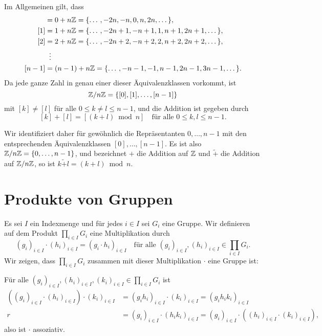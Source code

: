 Im Allgemeinen gilt, dass
\begin{align*}
 [0] &= 0+n\Zbb = \{\dotso, -2n, -n, 0, n, 2n, \dotso\}, \\
 [1] &= 1+n\Zbb = \{\dotso, -2n+1, -n+1, 1, n+1, 2n+1, \dotso\}, \\
 [2] &= 2+n\Zbb = \{\dotso, -2n+2, -n+2, 2, n+2, 2n+2, \dotso\}, \\
     &\;\;\vdots \\
 [n-1] &= (n-1)+n\Zbb = \{\dotso, -n-1, -1, n-1, 2n-1, 3n-1, \dotso\}.
\end{align*}
Da jede ganze Zahl in genau einer dieser Äquivalenzklassen vorkommt, ist
\[
 \mathbb{Z}/n\mathbb{Z} = \{[0], [1], \dotsc, [n-1]\}
\]
mit $[k] \neq [l]$ für alle $0 \leq k \neq l \leq n-1$, und die Addition ist gegeben durch
\[
 [k] + [l] = [(k+l) \bmod n]
 \quad
 \text{für alle $0 \leq k,l \leq n-1$}.
\]

Wir identifiziert daher für gewöhnlich die Repräsentanten $0, \dotsc, n-1$ mit den entsprechenden Äquivalenzklassen $[0], \dotsc, [n-1]$. Es ist also $\mathbb{Z}/n\mathbb{Z} = \{0, \dotsc, n-1\}$, und bezeichnet $+$ die Addition auf $\mathbb{Z}$ und $\tilde{+}$ die Addition auf $\mathbb{Z}/n\mathbb{Z}$, so ist $k \mathbin{\tilde{+}} l = (k+l) \bmod n$.





\section{Produkte von Gruppen}\label{sec: product of groups}

Es sei $I$ ein Indexmenge und für jedes $i \in I$ sei $G_i$ eine Gruppe. Wir definieren auf dem Produkt $\prod_{i \in I} G_i$ eine Multiplikation durch
\[
 (g_i)_{i \in I} \cdot (h_i)_{i \in I}
 = (g_i \cdot h_i)_{i \in I}
 \quad
 \text{für alle $(g_i)_{i \in I}, (h_i)_{i \in I} \in \prod_{i \in I} G_i$}.
\]
Wir zeigen, dass $\prod_{i \in I} G_i$ zusammen mit dieser Multiplikation $\cdot$ eine Gruppe ist:

Für alle $(g_i)_{i \in I}, (h_i)_{i \in I}, (k_i)_{i \in I} \in \prod_{i \in I} G_i$ ist
\begin{align*}
 ( (g_i)_{i \in I} \cdot (h_i)_{i \in I} ) \cdot (k_i)_{i \in I}
 &= (g_i h_i)_{i \in I} \cdot (k_i)_{i \in I}
 = (g_i h_i k_i)_{i \in I} \\r
 &= (g_i)_{i \in I} \cdot (h_i k_i)_{i \in I}
 = (g_i)_{i \in I} \cdot ( (h_i)_{i \in I} \cdot (k_i)_{i \in I} ),
\end{align*}
also ist $\cdot$ assoziativ.

